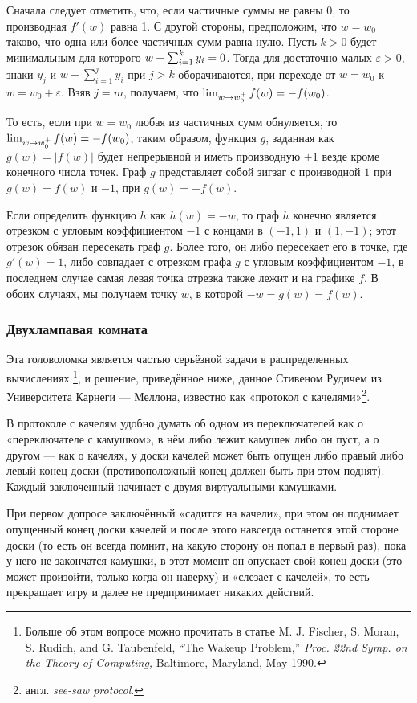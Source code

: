 Сначала следует отметить, что, если частичные суммы не равны $0$, то производная $f'(w)$ равна 1.
С другой стороны, предположим, что $w = w_0$ таково, что одна или более частичных сумм равна нулю.
Пусть $k > 0$ будет минимальным для которого $w+\sum_{i=1}^{k}y_i\z=0$.
Тогда для достаточно малых $\varepsilon>0$,
знаки $y_j$ и $w+\sum_{i=1}^{j}y_i$ при $j>k$ оборачиваются, при переходе от $w = w_0$ к $w = w_0+\varepsilon$.
Взяв $j = m$, получаем, что $\lim_{w\to w_0^+}f(w)\z=-f(w_0)$.

То есть, если при $w=w_0$ любая из частичных сумм обнуляется, то $\lim_{w\to w_0^+}f(w)\z=-f(w_0)$, таким образом, функция $g$, заданная как $g(w) =|f (w)|$ будет непрерывной и иметь производную $\pm1$ везде кроме конечного числа точек.
Граф $g$ представляет собой зигзаг с производной $1$ при $g (w) = f (w)$ и $-1$, при $g (w) = - f (w)$.

Если определить функцию $h$ как $h (w) = -w$, то граф $h$ конечно является отрезком с угловым коэффициентом $-1$ с концами в $(-1,1)$ и $(1,-1)$;
этот отрезок обязан пересекать граф $g$.
Более того, он либо пересекает его в точке, где $g'(w) = 1$, либо совпадает с отрезком графа $g$ с угловым коэффициентом $-1$, в последнем случае самая левая точка отрезка также лежит и на графике $f$.
В обоих случаях, мы получаем точку $w$, в которой $-w = g (w) = f (w)$. \heart

\subsubsection*{Двухлампавая комната}

Эта головоломка является частью серьёзной задачи в распределенных вычислениях%
\footnote{Больше об этом вопросе можно прочитать в статье M. J. Fischer, S. Moran, S. Rudich, and G. Taubenfeld, ``The Wakeup Problem,'' \emph{Proc. 22nd Symp. on the Theory of Computing,} Baltimore, Maryland, May 1990.}, и решение, приведённое ниже, данное Стивеном Рудичем из Университета Карнеги --- Меллона, известно как «протокол с качелями»\footnote{англ. \emph{see-saw protocol}.}.

В протоколе с качелям удобно думать об одном из переключателей как о «переключателе с камушком», в нём либо лежит камушек либо он пуст, а о другом --- как о качелях, у доски качелей может быть опущен либо правый либо  левый конец доски (противоположный конец должен быть при этом поднят).
Каждый заключенный начинает с двумя виртуальными камушками.

При первом допросе заключённый «садится на качели», при этом он поднимает опущенный конец доски качелей и
после этого навсегда останется этой стороне доски (то есть он всегда помнит, на какую сторону он попал в первый раз), пока у него не закончатся камушки, в этот момент он опускает свой конец доски (это может произойти, только когда он наверху) и «слезает с качелей», то есть прекращает игру и далее не предпринимает никаких действий.

